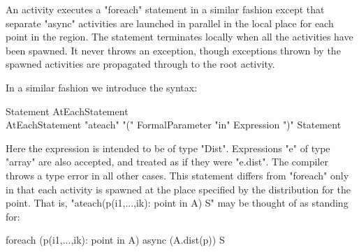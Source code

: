 An activity executes a \xcd"foreach" statement in a similar fashion
except that separate \xcd"async" activities are launched in parallel
in the local place for each point in the region. The statement
terminates locally when all the activities have been spawned. It never
throws an exception, though exceptions thrown by the spawned
activities are propagated through to the root activity.

In a similar fashion we introduce the syntax:

\begin{grammar}
Statement \: AtEachStatement \\
AtEachStatement \:
      \xcd"ateach" \xcd"(" FormalParameter \xcd"in" Expression \xcd")"
         Statement \\
\end{grammar}

Here the expression is intended to be of type \xcd"Dist".
Expressions \xcd"e" of type \xcd"array" are also accepted, and treated
as if they were \xcd"e.dist". The compiler throws a type error
in all other cases. This statement differs from \xcd"foreach" only in
that each activity is spawned at the place specified by the
distribution for the point. That is, 
\xcd"ateach(p(i1,...,ik): point in A) S" may
be thought of as standing for:
\begin{xten}
foreach (p(i1,...,ik): point in A) 
  async (A.dist(p)) {S}
\end{xten}

